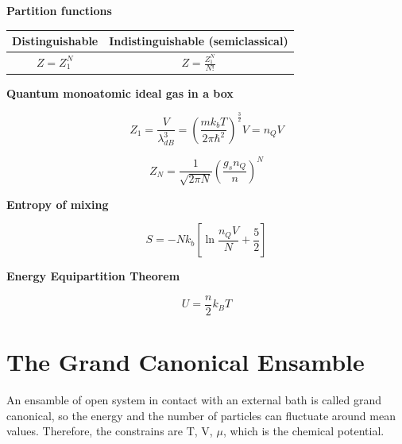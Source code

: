 \documentclass{article}
\begin{document}
\begin{tcolorbox}[colframe=gray!90, colback=gray!5, coltitle=white, sharp corners, title=\textbf{Ideal Gas, Summary}, fonttitle=\large\bfseries]
    \textbf{Partition functions}


    \renewcommand{\arraystretch}{1.5}
    \begin{center}
        \begin{tabular}{|c|c|}
            \hline
            \textbf{Distinguishable} & \textbf{Indistinguishable (semiclassical)} \\ \hline
            \( Z = Z_1^N \)          & \( Z = \frac{Z_1^N}{N!} \)                 \\ \hline
        \end{tabular}

    \end{center}


    \textbf{Quantum monoatomic ideal gas in a box}

    \begin{equation}
        Z_1 = \frac{V}{\lambda_{dB}^3}= \left( \frac{mk_bT}{2\pi\hbar^2} \right)^{\frac{3}{2}}V= n_QV
    \end{equation}

    \begin{equation}
        Z_N = \frac{1}{\sqrt{2\pi N}}\left( \frac{g_s n_Q}{n} \right)^N
    \end{equation}

    \textbf{Entropy of mixing}

    \begin{equation}
        S = -Nk_b\left[ \ln{\frac{n_QV}{N}} + \frac{5}{2} \right]
    \end{equation}

    \textbf{Energy Equipartition Theorem}

    \begin{equation}
        U = \frac{n}{2}k_BT
    \end{equation}

\end{tcolorbox}

\newpage


\section{The Grand Canonical Ensamble}

An ensamble of open system in contact with an external bath is called grand canonical,
so the energy and the number of particles can fluctuate around mean values.
Therefore, the constrains are T, V, $\mu$, which is the chemical potential.
\end{document}
